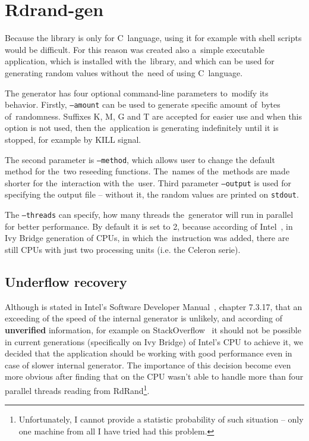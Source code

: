 
\chapter{Rdrand-gen} \label{chap:generator}

Because the library is only for C~language, using it for example with shell scripts would be difficult. For this reason was created also a~simple executable application, which is installed with the~library, and which can be used for generating random values without the~need of using C~language.

The generator has four optional command-line parameters to~modify its behavior. Firstly, {\tt --amount} can be used to generate specific amount of~bytes of~randomness. Suffixes K, M, G and T are accepted for easier use and when this option is not used, then the~application is generating indefinitely until it is stopped, for example by KILL signal.

The second parameter is {\tt --method}, which allows user to change the default method  for the~two reseeding functions. The~names of the~methods are made shorter for the~interaction with the~user. Third parameter {\tt --output} is used for specifying the output file -- without it, the random values are printed on {\tt stdout}. 

The {\tt --threads} can specify, how many threads the~generator will run in parallel for better performance. By default it is set to 2, because according of Intel~\cite{IntelArk}, in Ivy Bridge generation of CPUs, in which the~instruction was added, there are still CPUs with just two processing units (i.e. the Celeron serie).


\section{Underflow recovery}
Although is stated in Intel's Software Developer Manual~\cite{IntelSWManualVol1}, chapter 7.3.17, that an exceeding of the speed of the internal generator is unlikely, and according of {\bf unverified} information, for example on StackOverflow~\cite{StackoverflowRDRANDCharacteristics} it should not be possible in current generations (specifically on Ivy Bridge) of Intel's CPU to achieve it, we decided that the application should be working with good performance even in case of slower internal generator. The importance of this decision become even more obvious after finding that on  the CPU wasn't able to handle more than four parallel threads reading from RdRand\footnote{Unfortunately, I cannot provide a statistic probability of such situation -- only one machine from all I have tried had this problem.}.

